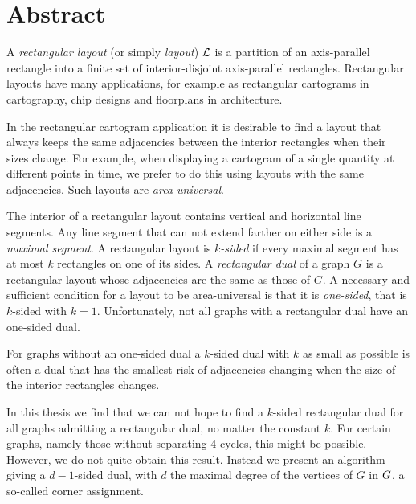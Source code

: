 
\section*{Abstract}
\thispagestyle{plain}

  A  \emph{rectangular layout} (or simply \emph{layout}) $\mathcal{L}$ is a partition of an axis-parallel rectangle into a finite set of interior-disjoint axis-parallel rectangles. Rectangular layouts have many applications, for example as rectangular cartograms in cartography, chip designs and floorplans in architecture.

  In the rectangular cartogram application it is desirable to find a layout that always keeps the same adjacencies between the interior rectangles when their sizes change. For example, when displaying a cartogram of a single quantity at different points in time, we prefer to do this using layouts with the same adjacencies. Such layouts are \emph{area-universal}.

  The interior of a rectangular layout contains vertical and horizontal line segments.
  Any line segment that can not extend farther on either side is a \emph{maximal segment}.
  A rectangular layout is \emph{$k$-sided} if every maximal segment has at most $k$ rectangles on one of its sides.
  A \emph{rectangular dual} of a graph $G$ is a rectangular layout whose adjacencies are the same as those of $G$.
  A necessary and sufficient condition for a layout to be area-universal is that it is \emph{one-sided}, that is $k$-sided with $k=1$.
  Unfortunately, not all graphs with a rectangular dual have an one-sided dual.

  For graphs without an one-sided dual a $k$-sided dual with $k$ as small as possible is often a dual that has the smallest risk of adjacencies changing when the size of the interior rectangles changes.

  In this thesis we find that we can not hope to find a $k$-sided rectangular dual for all graphs admitting a rectangular dual, no matter the constant $k$.
  For certain graphs, namely those without separating $4$-cycles, this might be possible. However, we do not quite obtain this result. Instead we present an algorithm giving a $d-1$-sided dual, with $d$ the maximal degree of the vertices of $G$ in $\bar{G}$, a so-called corner assignment.
